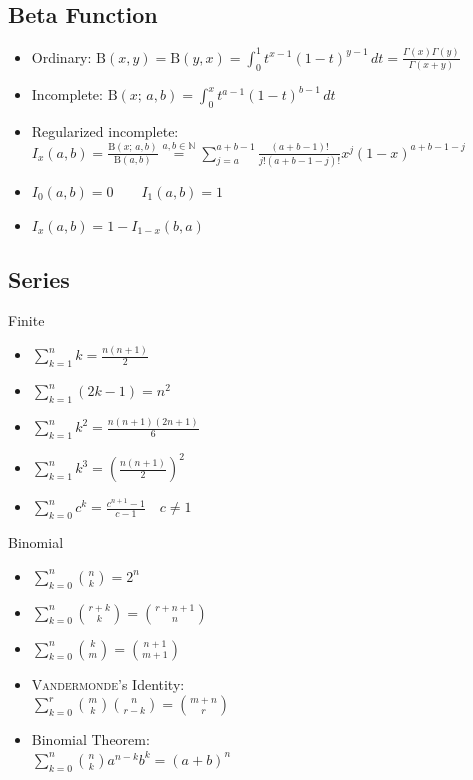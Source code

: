 \documentclass[landscape]{article}
\newenvironment{titemize}[1]{
  \begin{minipage}[h]{\columnwidth}
    #1
    \begin{itemize}
}{
    \end{itemize}
  \end{minipage}
}
\begin{document}
\begin{multicols*}{2}
\subsection{Beta Function}
\label{sec:math:beta}

\begin{itemize}
  \item Ordinary: $\text{B}(x,y) = \text{B}(y,x) 
    = \displaystyle\int_0^1 t^{x-1}(1-t)^{y-1} \,dt
    = \displaystyle\frac{\Gamma(x)\Gamma(y)}{\Gamma(x+y)}$
  \item Incomplete: $\text{B}(x;\,a,b) 
    = \displaystyle\int_0^x t^{a-1}(1-t)^{b-1} \,dt$
  \item Regularized incomplete: \\
    $I_x(a,b) = \displaystyle\frac{\text{B}(x;\,a,b)}{\text{B}(a,b)}
      \stackrel{a,b\in\mathbb N}{=} 
      \sum_{j=a}^{a+b-1} \frac{(a+b-1)!}{j!(a+b-1-j)!}x^j(1-x)^{a+b-1-j}$
  \item $I_0(a,b) = 0 \qquad I_1(a,b) = 1$
  \item $I_x(a,b) = 1 - I_{1-x}(b,a)$
\end{itemize}


\subsection{Series}

\begin{multicols}{2}
\begin{titemize}{Finite}
  \item $\displaystyle\sum_{k=1}^n k = \frac{n(n+1)}{2}$
  \item $\displaystyle\sum_{k=1}^n (2k-1) = n^2$
  \item $\displaystyle\sum_{k=1}^n k^2 = \frac{n(n+1)(2n+1)}{6}$
  \item $\displaystyle\sum_{k=1}^n k^3 = \left(\frac{n(n+1)}{2}\right)^2$
  \item $\displaystyle\sum_{k=0}^n c^k = \frac{c^{n+1}-1}{c-1} \quad c\neq1$
\end{titemize}

\begin{titemize}{Binomial}
  \item $\displaystyle\sum_{k=0}^n \binom{n}{k} = 2^n$
  \item $\displaystyle\sum_{k=0}^n \binom{r+k}{k}=\binom{r+n+1}{n}$
  \item $\displaystyle\sum_{k=0}^n \binom{k}{m}=\binom{n+1}{m+1}$
  \item \textsc{Vandermonde}'s Identity:\\
    $\displaystyle\sum_{k=0}^r \binom{m}{k}\binom{n}{r-k}=\binom{m+n}{r}$
  \item Binomial Theorem:\\
    $\displaystyle\sum_{k=0}^n \binom{n}{k}a^{n-k}b^k = (a+b)^n$ 
\end{titemize}
\end{multicols}


\end{multicols*}
\end{document}
